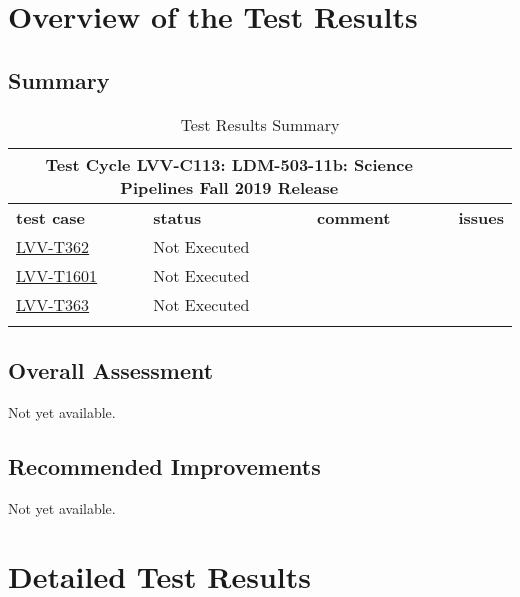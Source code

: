 \documentclass[DM,lsstdraft,STR,toc]{lsstdoc}
\begin{document}
\newpage

\section{Overview of the Test Results}
\label{sect:overview}

\subsection{Summary}
\label{sect:summarytable}

\begin{longtable}{p{}p{}p{}p{}}
\toprule

  \multicolumn{3}{c}{ Test Cycle {\bf LVV-C113: LDM-503-11b: Science Pipelines Fall 2019 Release
 }} \\\hline

  {\bf \footnotesize test case} & {\bf \footnotesize status} & {\bf \footnotesize comment} & {\bf \footnotesize issues} \\\toprule

    \href{https://jira.lsstcorp.org/secure/Tests.jspa#/testCase/LVV-T362}{LVV-T362}
    & Not Executed &  &
    \\\hline
    \href{https://jira.lsstcorp.org/secure/Tests.jspa#/testCase/LVV-T1601}{LVV-T1601}
    & Not Executed &  &
    \\\hline
    \href{https://jira.lsstcorp.org/secure/Tests.jspa#/testCase/LVV-T363}{LVV-T363}
    & Not Executed &  &
    \\\hline

\caption{Test Results Summary}
\label{table:summary}
\end{longtable}

\subsection{Overall Assessment}
\label{sect:overallassessment}

Not yet available.

\subsection{Recommended Improvements}
\label{sect:recommendations}

Not yet available.

\newpage
\section{Detailed Test Results}
\label{sect:detailedtestresults}
\end{document}

